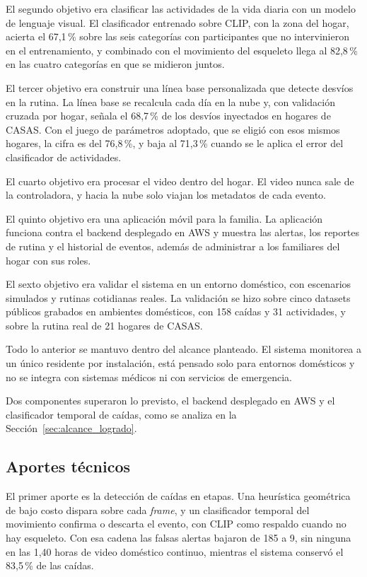 El segundo objetivo era clasificar las actividades de la vida diaria con un modelo de lenguaje visual.
El clasificador entrenado sobre CLIP, con la zona del hogar, acierta el 67,1\,\% sobre las seis categorías con participantes que no intervinieron en el entrenamiento, y combinado con el movimiento del esqueleto llega al 82,8\,\% en las cuatro categorías en que se midieron juntos.

El tercer objetivo era construir una línea base personalizada que detecte desvíos en la rutina.
La línea base se recalcula cada día en la nube y, con validación cruzada por hogar, señala el 68,7\,\% de los desvíos inyectados en hogares de CASAS.
Con el juego de parámetros adoptado, que se eligió con esos mismos hogares, la cifra es del 76,8\,\%, y baja al 71,3\,\% cuando se le aplica el error del clasificador de actividades.

El cuarto objetivo era procesar el video dentro del hogar.
El video nunca sale de la controladora, y hacia la nube solo viajan los metadatos de cada evento.

El quinto objetivo era una aplicación móvil para la familia.
La aplicación funciona contra el backend desplegado en AWS y muestra las alertas, los reportes de rutina y el historial de eventos, además de administrar a los familiares del hogar con sus roles.

El sexto objetivo era validar el sistema en un entorno doméstico, con escenarios simulados y rutinas cotidianas reales.
La validación se hizo sobre cinco datasets públicos grabados en ambientes domésticos, con 158 caídas y 31 actividades, y sobre la rutina real de 21 hogares de CASAS.

Todo lo anterior se mantuvo dentro del alcance planteado.
El sistema monitorea a un único residente por instalación, está pensado solo para entornos domésticos y no se integra con sistemas médicos ni con servicios de emergencia.

Dos componentes superaron lo previsto, el backend desplegado en AWS y el clasificador temporal de caídas, como se analiza en la Sección~\ref{sec:alcance_logrado}.

\subsection{Aportes técnicos}

El primer aporte es la detección de caídas en etapas.
Una heurística geométrica de bajo costo dispara sobre cada \textit{frame}, y un clasificador temporal del movimiento confirma o descarta el evento, con CLIP como respaldo cuando no hay esqueleto.
Con esa cadena las falsas alertas bajaron de 185 a 9, sin ninguna en las 1,40 horas de video doméstico continuo, mientras el sistema conservó el 83,5\,\% de las caídas.


